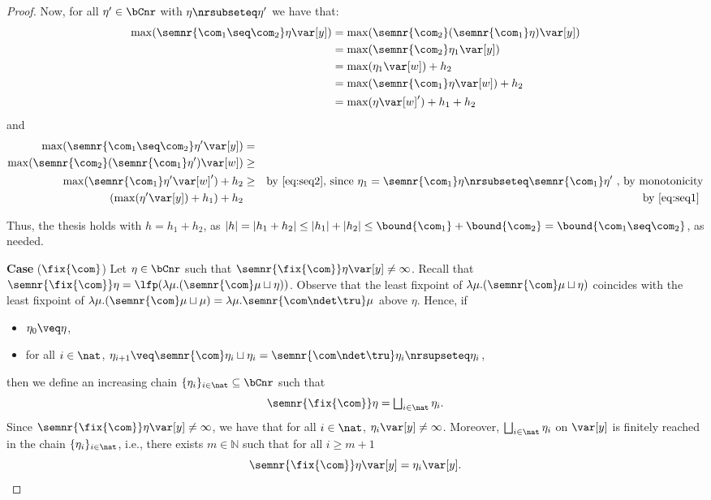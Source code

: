 \begin{proof}
  Now, for all \(\eta' \in \bCnr\) with \(\eta \nrsubseteq \eta'\) we have that:
  \begin{align*}
    \max(\semnr{\com_1 \seq \com_2}\eta \var[y])
    &= \max(\semnr{\com_2}(\semnr{\com_1}\eta) \var[y])\\
    & = \max(\semnr{\com_2}\eta_1 \var[y])\\
    & = \max(\eta_1 \var[w]) + h_2\\
    & = \max(\semnr{\com_1}\eta \var[w]) + h_2\\
    &= \max(\eta \var[w]')+h_1 + h_2
  \end{align*}
  and
  \begin{align*}
    \max(\semnr{\com_1 \seq \com_2}\eta' \var[y]) & = & \\ 
    \max(\semnr{\com_2}(\semnr{\com_1}\eta') \var[w]) & \geq & \\ 
    \max(\semnr{\com_1}\eta' \var[w]') + h_2 & \geq & 
    \text{by \eqref{eq:seq2}, since } \eta_1 = \semnr{\com_1}\eta \nrsubseteq \semnr{\com_1}\eta' \text{ , by monotonicity} \\
    (\max(\eta' \var[y]) +h_1) + h_2 & & \text{by \eqref{eq:seq1}}\
  \end{align*}

  Thus, the thesis holds with \(h= h_1+h_2\), as
  \(|h| =|h_1 +h_2| \leq |h_1| + |h_2| \leq \bound{\com_1} +
  \bound{\com_2} = \bound{\com_1 \seq \com_2}\), as needed.



  
  \medskip
  
  \noindent
  \textbf{Case} (\(\fix{\com}\)) 
  Let \(\eta \in \bCnr\) such that
  \(\semnr{\fix{\com}} \eta \var[y] \neq \infty\). Recall that
  \(\semnr{\fix{\com}} \eta = \lfp(\lambda \mu. (\semnr{\com}
    \mu \sqcup\eta))\). Observe that the least fixpoint of
  \(\lambda \mu. (\semnr{\com}
  \mu \sqcup\eta)\) coincides with the least
  fixpoint of
  \(\lambda \mu. (\semnr{\com} \mu  \sqcup \mu) = \lambda \mu. \semnr{ \com\ndet \tru} \mu\) above \(\eta\). Hence, if
  \begin{itemize}
  \item \(\eta_0 \veq \eta\),
  \item for all \(i\in \nat\),
    \(\eta_{i+1} \veq \semnr{\com} \eta_i \sqcup \eta_i= \semnr{\com \ndet
    \tru} \eta_i \nrsupseteq \eta_i\),
  \end{itemize}
  then we define an increasing chain \(\{\eta_i\}_{i\in \nat}\subseteq \bCnr\) such that
  \[ 
  \semnr{\fix{\com}} \eta = \textstyle\bigsqcup_{i \in \nat} \eta_i.
  \]
  Since \(\semnr{\fix{\com}} \eta \var[y] \neq \infty\), we have that
  for all \(i\in \nat\), \(\eta_i \var[y] \neq \infty\). Moreover,
  \(\textstyle\bigsqcup_{i \in \nat} \eta_i\) on \(\var[y]\) is
  finitely reached in the chain \(\{\eta_i\}_{i\in \nat}\), i.e.,
  there exists \(m \in \mathbb{N}\) such that for all \(i \geq m+1\)
  \[
  \semnr{\fix{\com}} \eta \var[y] = \eta_{i} \var[y].
  \]


\end{proof}
